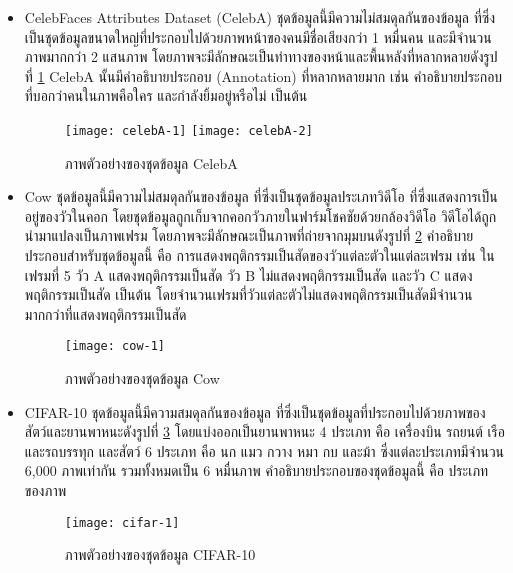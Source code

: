 \begin{itemize}
  \item CelebFaces Attributes Dataset (CelebA) \cite{dataset:celebA} ชุดข้อมูลนี้มีความไม่สมดุลกันของข้อมูล ที่ซึ่งเป็นชุดข้อมูลขนาดใหญ่ที่ประกอบไปด้วยภาพหน้าของคนมีชื่อเสียงกว่า 1 หมื่นคน และมีจำนวนภาพมากกว่า 2 แสนภาพ โดยภาพจะมีลักษณะเป็นท่าทางของหน้าและพื้นหลังที่หลากหลายดังรูปที่ \ref{fig:dataset:celebA-1} CelebA นั้นมีคำอธิบายประกอบ (Annotation) ที่หลากหลายมาก เช่น คำอธิบายประกอบที่บอกว่าคนในภาพคือใคร และกำลังยิ้มอยู่หรือไม่ เป็นต้น
  
\begin{figure}[h]
    \centering
    \texttt{[image: celebA-1]}
    \texttt{[image: celebA-2]}
    \caption{ภาพตัวอย่างของชุดข้อมูล CelebA}
    \label{fig:dataset:celebA-1}
\end{figure}

  \item Cow \cite{dataset:cow} ชุดข้อมูลนี้มีความไม่สมดุลกันของข้อมูล ที่ซึ่งเป็นชุดข้อมูลประเภทวิดีโอ ที่ซึ่งแสดงการเป็นอยู่ของวัวในคอก โดยชุดข้อมูลถูกเก็บจากคอกวัวภายในฟาร์มโชคชัยด้วยกล้องวิดีโอ วิดีโอได้ถูกนำมาแปลงเป็นภาพเฟรม โดยภาพจะมีลักษณะเป็นภาพที่ถ่ายจากมุมบนดังรูปที่ \ref{fig:dataset:cow-1} คำอธิบายประกอบสำหรับชุดข้อมูลนี้ คือ การแสดงพฤติกรรมเป็นสัดของวัวแต่ละตัวในแต่ละเฟรม เช่น ในเฟรมที่ 5 วัว A แสดงพฤติกรรมเป็นสัด วัว B ไม่แสดงพฤติกรรมเป็นสัด และวัว C แสดงพฤติกรรมเป็นสัด เป็นต้น โดยจำนวนเฟรมที่วัวแต่ละตัวไม่แสดงพฤติกรรมเป็นสัดมีจำนวนมากกว่าที่แสดงพฤติกรรมเป็นสัด
  
  \begin{figure}[h]
    \centering
    \texttt{[image: cow-1]}
    \caption{ภาพตัวอย่างของชุดข้อมูล Cow}
    \label{fig:dataset:cow-1}
\end{figure}

  \item CIFAR-10 \cite{dataset:cifar-10} ชุดข้อมูลนี้มีความสมดุลกันของข้อมูล ที่ซึ่งเป็นชุดข้อมูลที่ประกอบไปด้วยภาพของสัตว์และยานพาหนะดังรูปที่ \ref{fig:dataset:cifar-1} โดยแบ่งออกเป็นยานพาหนะ 4 ประเภท คือ เครื่องบิน รถยนต์ เรือ และรถบรรทุก และสัตว์ 6 ประเภท คือ นก แมว กวาง หมา กบ และม้า ซึ่งแต่ละประเภทมีจำนวน 6,000 ภาพเท่ากัน รวมทั้งหมดเป็น 6 หมื่นภาพ คำอธิบายประกอบของชุดข้อมูลนี้ คือ ประเภทของภาพ
  
    \begin{figure}[h]
    \centering
    \texttt{[image: cifar-1]}
    \caption{ภาพตัวอย่างของชุดข้อมูล CIFAR-10}
    \label{fig:dataset:cifar-1}
\end{figure}

\end{itemize}
